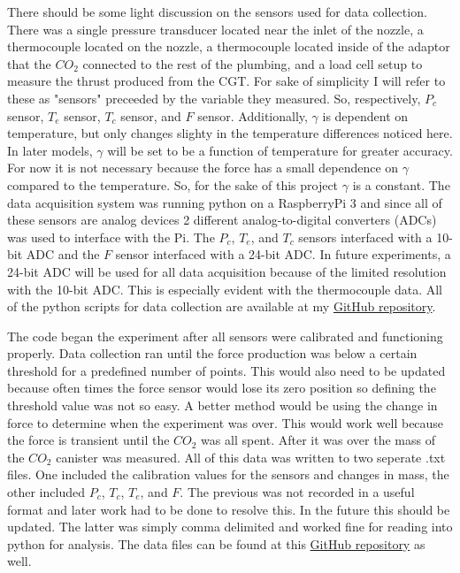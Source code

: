 \begin{tcolorbox}[breakable,title=Data Sensors, height fixed for=first and middle]
There should be some light discussion on the sensors used for data collection. There was a single pressure transducer located near the inlet of the nozzle, a thermocouple located on the nozzle, a thermocouple located inside of the adaptor that the $CO_2$ connected to the rest of the plumbing, and a load cell setup to measure the thrust produced from the CGT. For sake of simplicity I will refer to these as "sensors" preceeded by the variable they measured. So, respectively, $P_c$ sensor, $T_e$ sensor, $T_c$ sensor, and $F$ sensor. Additionally, $\gamma$ is dependent on temperature, but only changes slighty in the temperature differences noticed here. In later models, $\gamma$ will be set to be a function of temperature for greater accuracy. For now it is not necessary because the force has a small dependence on $\gamma$ compared to the temperature. So, for the sake of this project $\gamma$ is a constant. The data acquisition system was running python on a RaspberryPi 3 and since all of these sensors are analog devices 2 different analog-to-digital converters (ADCs) was used to interface with the Pi. The $P_c$, $T_e$, and $T_c$ sensors interfaced with a 10-bit ADC and the $F$ sensor interfaced with a 24-bit ADC. In future experiments, a 24-bit ADC will be used for all data acquisition because of the limited resolution with the 10-bit ADC. This is especially evident with the thermocouple data. All of the python scripts for data collection are available at my \href{https://github.com/maxmhuggins/RCS_HAB/tree/master/On_Ground_Testing/Code}{GitHub repository}.
\end{tcolorbox}
The code began the experiment after all sensors were calibrated and functioning properly. Data collection ran until the force production was below a certain threshold for a predefined number of points. This would also need to be updated because often times the force sensor would lose its zero position so defining the threshold value was not so easy. A better method would be using the change in force to determine when the experiment was over. This would work well because the force is transient until the $CO_2$ was all spent. After it was over the mass of the $CO_2$ canister was measured. All of this data was written to two seperate .txt files. One included the calibration values for the sensors and changes in mass, the other included $P_c$, $T_c$, $T_e$, and $F$. The previous was not recorded in a useful format and later work had to be done to resolve this. In the future this should be updated. The latter was simply comma delimited and worked fine for reading into python for analysis. The data files can be found at this \href{https://github.com/maxmhuggins/RCS_HAB/tree/master/On_Ground_Testing/Data_and_Analysis/Experimental_Data_Analysis/Refined_Data_Files}{GitHub repository} as well.
